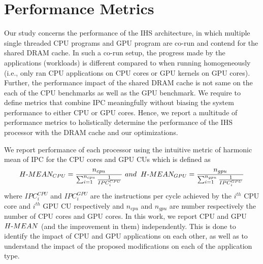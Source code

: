 \section{Performance Metrics} \label{perf-metrics}
Our study concerns the performance of the IHS architecture, in which multiple single threaded CPU programs and GPU program are co-run and contend for the shared DRAM cache. 
In such a co-run setup, the progress made by the applications (workloads) is different compared to when running homogeneously (i.e., only ran CPU applications on CPU cores or GPU kernels on GPU cores). Further, the performance impact of the shared DRAM cache is not same on the each of the CPU benchmarks as well as the GPU benchmark. We require to define metrics that combine IPC meaningfully without biasing the system performance to either CPU or GPU cores. Hence, we report a multitude of performance metrics to holistically determine the performance of the IHS processor with the DRAM cache and our optimizations. 
\par We report performance of each processor using the intuitive metric of harmonic mean of IPC for the CPU cores and GPU CUs which is defined as 
{
\begin{equation*}
H\textnormal{-}MEAN_{CPU} = \frac{n_{cpu}}{\sum_{i=1}^{n_{cpu}} \frac{1}{IPC_{i}^{CPU}}} \ and \hspace{0.2cm} H\textnormal{-}MEAN_{GPU} = \frac{n_{gpu}}{\sum_{i=1}^{n_{gpu}} \frac{1}{IPC_{i}^{GPU}}} 
\end{equation*}
}
where $IPC_i^{CPU}$ and $IPC_i^{GPU}$ are the instructions per cycle achieved by the $i^{th}$ CPU core and $i^{th}$ GPU CU respectively and $n_{cpu}$ and $n_{gpu}$ are number respectively the number of CPU cores and GPU cores.
In this work, we report CPU and GPU $H\textnormal{-}MEAN$ (and the improvement in them) independently. This is done to identify the impact of CPU and GPU applications on each other, as well as to understand the impact of the proposed modifications on each of the application type. 

